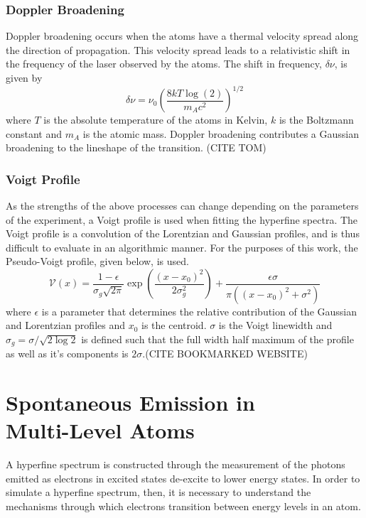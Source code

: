 \documentclass[12pt,a4paper,margin=1in]{report}
\begin{document}
\subsubsection*{Doppler Broadening}
Doppler broadening occurs when the atoms have a thermal velocity spread along the direction of propagation. This velocity spread leads to a relativistic shift in the frequency of the laser observed by the atoms. The shift in frequency, $\delta \nu$, is given by
\begin{equation}
\delta \nu = \nu_0\left(\frac{8kT\log(2)}{m_Ac^2}\right)^{1/2}
\end{equation}
where $T$ is the absolute temperature of the atoms in Kelvin, $k$ is the Boltzmann constant and $m_A$ is the atomic mass. Doppler broadening contributes a Gaussian broadening to the lineshape of the transition. (CITE TOM)

\subsubsection*{Voigt Profile}
As the strengths of the above processes can change depending on the parameters of the experiment, a Voigt profile is used when fitting the hyperfine spectra. The Voigt profile is a convolution of the Lorentzian and Gaussian profiles, and is thus difficult to evaluate in an algorithmic manner. For the purposes of this work, the Pseudo-Voigt profile, given below, is used.
\begin{equation}
\mathcal{V}(x) = \frac{1-\epsilon}{\sigma_g\sqrt{2\pi}}\exp\left(\frac{(x-x_0)^2}{2\sigma_g^2}\right)+\frac{\epsilon\sigma}{\pi((x-x_0)^2+\sigma^2)}
\end{equation}
where $\epsilon$ is a parameter that determines the relative contribution of the Gaussian and Lorentzian profiles and $x_0$ is the centroid. $\sigma$ is the Voigt linewidth and $\sigma_g = \sigma/\sqrt{2\log{2}}$ is defined such that the full width half maximum of the profile as well as it's components is $2\sigma$.(CITE BOOKMARKED WEBSITE)
\section{Spontaneous Emission in \\ Multi-Level Atoms}
\label{ALI}
A hyperfine spectrum is constructed through the measurement of the photons emitted as electrons in excited states de-excite to lower energy states. In order to simulate a hyperfine spectrum, then, it is necessary to understand the mechanisms through which electrons transition between energy levels in an atom.
\end{document}
